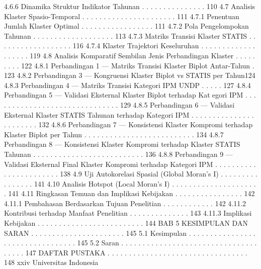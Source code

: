 4.6.6 Dinamika Struktur Indikator Tahunan . . . . . . . . . . . . . . . 110
4.7 Analisis Klaster Spasio-Temporal . . . . . . . . . . . . . . . . . . . . . . 111
4.7.1 Penentuan Jumlah Klaster Optimal . . . . . . . . . . . . . . . . . 111
4.7.2 Pola Pengelompokan Tahunan . . . . . . . . . . . . . . . . . . . 113
4.7.3 Matriks Transisi Klaster STATIS . . . . . . . . . . . . . . . . . . 116
4.7.4 Klaster Trajektori Keseluruhan . . . . . . . . . . . . . . . . . . . 119
4.8 Analisis Komparatif Sembilan Jenis Perbandingan Klaster . . . . . . . . . 122
4.8.1 Perbandingan 1 — Matriks Transisi Klaster Biplot Antar-Tahun . 123
4.8.2 Perbandingan 3 — Kongruensi Klaster Biplot vs STATIS per Tahun124
4.8.3 Perbandingan 4 — Matriks Transisi Kategori IPM UNDP . . . . . 127
4.8.4 Perbandingan 5 — Validasi Eksternal Klaster Biplot terhadap Kategori IPM . . . . . . . . . . . . . . . . . . . . . . . . . . . . . . 129
4.8.5 Perbandingan 6 — Validasi Eksternal Klaster STATIS Tahunan
terhadap Kategori IPM . . . . . . . . . . . . . . . . . . . . . . . 132
4.8.6 Perbandingan 7 — Konsistensi Klaster Kompromi terhadap Klaster
Biplot per Tahun . . . . . . . . . . . . . . . . . . . . . . . . . . 134
4.8.7 Perbandingan 8 — Konsistensi Klaster Kompromi terhadap Klaster
STATIS Tahunan . . . . . . . . . . . . . . . . . . . . . . . . . . 136
4.8.8 Perbandingan 9 — Validasi Eksternal Final Klaster Kompromi
terhadap Kategori IPM . . . . . . . . . . . . . . . . . . . . . . . 138
4.9 Uji Autokorelasi Spasial (Global Moran’s I) . . . . . . . . . . . . . . . . 141
4.10 Analisis Hotspot (Local Moran’s I) . . . . . . . . . . . . . . . . . . . . . 141
4.11 Ringkasan Temuan dan Implikasi Kebijakan . . . . . . . . . . . . . . . . 142
4.11.1 Pembahasan Berdasarkan Tujuan Penelitian . . . . . . . . . . . . 142
4.11.2 Kontribusi terhadap Manfaat Penelitian . . . . . . . . . . . . . . 143
4.11.3 Implikasi Kebijakan . . . . . . . . . . . . . . . . . . . . . . . . . 144
BAB 5 KESIMPULAN DAN SARAN . . . . . . . . . . . . . . . . . . . . . . 145
5.1 Kesimpulan . . . . . . . . . . . . . . . . . . . . . . . . . . . . . . . . . 145
5.2 Saran . . . . . . . . . . . . . . . . . . . . . . . . . . . . . . . . . . . . . 147
DAFTAR PUSTAKA . . . . . . . . . . . . . . . . . . . . . . . . . . . . . . . . . 148
xxiv Universitas Indonesia

